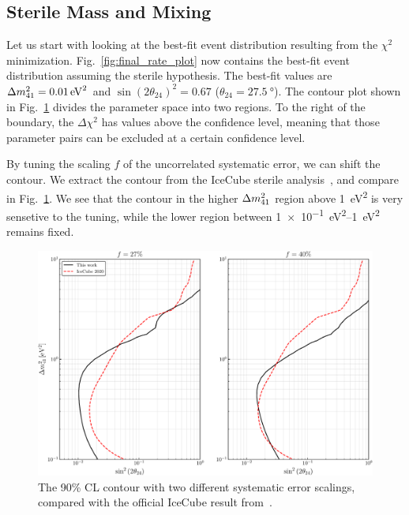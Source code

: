 \subsection{Sterile Mass and Mixing}
Let us start with looking at the best-fit event distribution resulting from the $\chi^2$ minimization.
Fig.~\ref{fig:final_rate_plot} now contains the best-fit event distribution assuming the sterile hypothesis.
The best-fit values are $\dm[41] = \SI{0.01}{\eV\squared}$ and 
$\sin(2\theta_{24})^2 = 0.67$ ($\theta_{24} = \SI{27.5}{\degree}$). %
The contour plot shown in Fig.~\ref{fig:error_tuning} divides the parameter space into two regions.
To the right of the boundary, the $\Delta \chi^2$ has values above the confidence level, meaning that 
those parameter pairs can be excluded at a certain confidence level.

By tuning the scaling $f$ of the uncorrelated systematic error, we can shift the contour. We extract the contour from the 
IceCube sterile analysis~\cite{IC2020}, and compare in Fig.~\ref{fig:error_tuning}. We see that the contour in the 
higher $\dm[41]$ region above \SI{1}{\eV\squared} is very sensetive to the tuning, while the lower region between \SIrange[]{1e-1}{1}{\eV\squared}
remains fixed. %
\begin{figure}
    \centering
    \includegraphics[scale=0.58]{figures/s24_error_tuning.pdf}
    \caption{The 90\% CL contour with two different systematic error scalings, compared 
    with the official IceCube result from~\cite{IC2020}.}\label{fig:error_tuning}
\end{figure}

